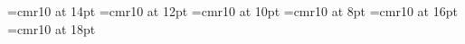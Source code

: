 \font\normal=cmr10 at 14pt
\font\smallish=cmr10 at 12pt
\font\smaller=cmr10 at 10pt
\font\smallest=cmr10 at 8pt
\font\larger=cmr10 at 16pt
\font\largest=cmr10 at 18pt

\def\rm{\normal}
\rm
